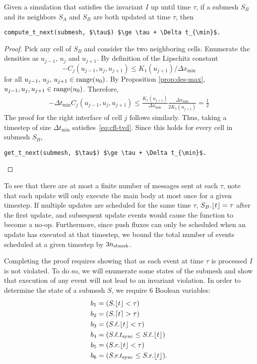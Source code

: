 \begin{lemma}
\label{lem:progress-guarantee}
Given a simulation that satisfies the invariant $I$ up until time $\tau$, if a submesh $S_B$ and its neighbors $S_A$ and $S_B$ are both updated at time $\tau$, then
\begin{lstlisting}[mathescape=true]
    compute_t_next(submesh, $\tau$) $\ge \tau + \Delta t_{\min}$.
\end{lstlisting}
\end{lemma}
\begin{proof}
Pick any cell of $S_B$ and consider the two neighboring cells. Enumerate the densities as $u_{j-1},\,u_j$ and $u_{j+1}$. 
By definition of the Lipschitz constant
\begin{equation*}
-C_j(u_{j-1}, u_j, u_{j+1}) \le K_1(u_{j+1})/\Delta x_{\min}
\end{equation*}
for all $u_{j-1},\,u_j,\,u_{j+1} \in \operatorname{range}(u_0)$.
By Proposition \ref{prop:des-max}, $u_{j-1}, u_j, u_{j+1} \in \operatorname{range}(u_0)$. Therefore,
\begin{align*}
-\Delta t_{\min} C_j(u_{j-1}, u_j, u_{j+1}) \le \frac{K_1(u_{j+1})}{\Delta x_{\min}} \frac{\Delta x_{\min}}{2K_1(u_{j+1})} = \frac{1}{2}
\end{align*}
The proof for the right interface of cell $j$ follows similarly. Thus, taking a timestep of size $\Delta t_{\min}$ satisfies~\eqref{eq:cfl-tvd}.
Since this holds for every cell in submesh $S_B$,
\begin{lstlisting}[mathescape=true]
get_t_next(submesh, $\tau$) $\ge \tau + \Delta t_{\min}$.
\end{lstlisting}
\end{proof}

To see that there are at most a finite number of messages sent at each $\tau$, note that each update will only execute the main body at most once for a given timestep. If multiple updates are scheduled for the same time $\tau$, $S_B.\lfloor t \rfloor = \tau$ after the first update, and subsequent update events would cause the function to become a no-op. Furthermore, since push fluxes can only be scheduled when an update has executed at that timestep, we bound the total number of events scheduled at a given timestep by $3 n_{\text{sbmsh}}$.

Completing the proof requires showing that as each event at time $\tau$ is processed $I$ is not violated. To do so, we will enumerate some states of the submesh and show that execution of any event will not lead to an invariant violation. In order to determine the state of a submesh $S$, we require 6 Boolean variables:
\begin{align*}
b_1 &= (S.\lfloor t \rfloor < \tau)\\
b_2 &= (S.\lceil t \rceil > \tau)\\
b_3 &= (S.\ell.\lfloor t \rfloor < \tau)\\
b_4 &= (S.\ell.t_{\text{sync}} \le S.\ell.\lfloor t \rfloor)\\
b_5 &= (S.r.\lfloor t \rfloor < \tau) \\
b_6 &= (S.r.t_{\text{sync}} \le S.r.\lfloor t \rfloor).
\end{align*}

